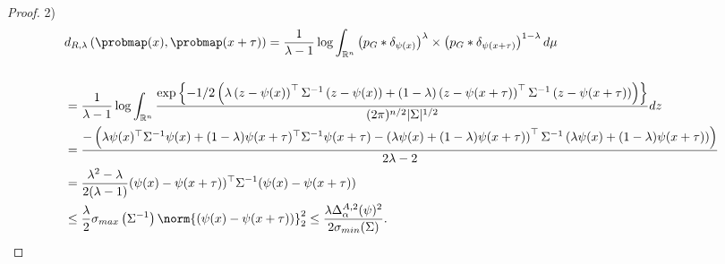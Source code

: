 \begin{proof}
   2)\begin{align}
      & d_{R,\lambda}\left( \probmap(x),\probmap(x+\tau) \right) = \frac{1}{\lambda -1}\log \int_{\mathbb{R}^{n}} \left(p_G * \delta_{\psi(x)}\right)^{\lambda}\times \left(p_G* \delta_{\psi(x+\tau)}\right)^{1-\lambda} d\mu \\\\
      &= \frac{1}{\lambda -1}\log \int_{\mathbb{R}^{n}} \frac{\exp\left\{-1/2\left(\lambda\left(z - \psi(x)\right)^\top\Sigma^{-1}\left(z - \psi(x)\right) + (1-\lambda)\left(z - \psi(x+\tau)\right)^\top\Sigma^{-1}\left(z - \psi(x+\tau)\right)\right)\right\}}{(2 \pi)^{n/2}|\Sigma|^{1/2}}  dz \\
      &= \frac{-\left(\lambda \psi(x)^\top\Sigma^{-1}\psi(x) + (1-\lambda) \psi(x+\tau)^\top\Sigma^{-1}\psi(x+\tau) - \left(\lambda \psi(x) + (1- \lambda) \psi(x+\tau)\right)^\top\Sigma^{-1}\left(\lambda \psi(x) + (1- \lambda) \psi(x+\tau)\right)\right)}{2\lambda -2} \\
      &= \frac{\lambda^{2} - \lambda}{2(\lambda -1)} (\psi(x) - \psi(x+\tau))^\top \Sigma^{-1}(\psi(x) - \psi(x+\tau))\\
      &\leq \frac{\lambda}{2} \sigma_{max}\left(\Sigma^{-1}\right) \norm{(\psi(x) - \psi(x+\tau))}_2^2 \leq \frac{\lambda \Delta^{A,2}_{\alpha}(\psi)^2 }{ 2 \sigma_{min}(\Sigma)}.
    \end{align}
\end{proof}


